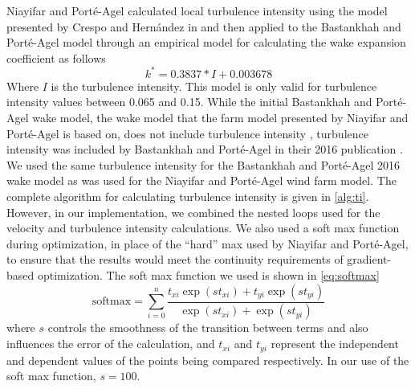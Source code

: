 \documentclass[conf]{new-aiaa}
\begin{document}
Niayifar and Port\'{e}-Agel calculated local turbulence intensity using the model presented by Crespo and Hern\'{a}ndez in \cite{crespo1996} and then applied to the Bastankhah and Port\'{e}-Agel model through an empirical model for calculating the wake expansion coefficient as follows \cite{niayifar2016}
 \begin{equation} \label{eq:ti_npa}
 	k^* = 0.3837*I + 0.003678
 \end{equation}
%
Where $I$ is the turbulence intensity. This model is only valid for turbulence intensity values between 0.065 and 0.15. While the initial Bastankhah and Port\'{e}-Agel wake model, the wake model that the farm model presented by Niayifar and Port\'{e}-Agel is based on, does not include turbulence intensity \cite{bastankhah2014}, turbulence intensity was included by Bastankhah and Port\'{e}-Agel in their 2016 publication \cite{bastankhah2016}. We used the same turbulence intensity for the Bastankhah and Port\'{e}-Agel 2016 wake model as was used for the Niayifar and Port\'{e}-Agel wind farm model. The complete algorithm for calculating turbulence intensity is given in \cref{alg:ti}. However, in our implementation, we combined the nested loops used for the velocity and turbulence intensity calculations. We also used a soft max function during optimization, in place of the ``hard'' max used by Niayifar and Port\'{e}-Agel, to ensure that the results would meet the continuity requirements of gradient-based optimization. The soft max function we used is shown in \cref{eq:softmax}
%
%
\begin{equation} \label{eq:softmax}
	\text{softmax} = \sum_{i=0}^n \frac{t_{xi}\exp(st_{xi})+t_{yi}\exp(st_{yi})}{\exp(st_{xi})+\exp(st_{yi})}
\end{equation}
where $s$ controls the smoothness of the transition between terms and also influences the error of the calculation, and $t_{xi}$ and $t_{yi}$ represent the independent and dependent values of the points being compared respectively. In our use of the soft max function, $s=100$.
\end{document}
